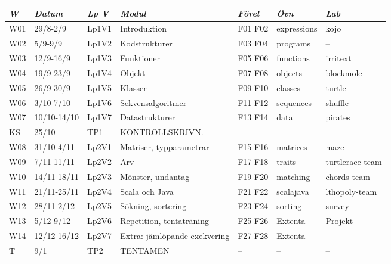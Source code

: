 \begin{tabular}{l|l|l|l|l|l|l}
\textit{W} & \textit{Datum} & \textit{Lp V} & \textit{Modul} & \textit{Förel} & \textit{Övn} & \textit{Lab} \\ \hline \hline
W01 & 29/8-2/9 & Lp1V1 & Introduktion & F01 F02 & expressions & kojo \\
W02 & 5/9-9/9 & Lp1V2 & Kodstrukturer & F03 F04 & programs & -- \\
W03 & 12/9-16/9 & Lp1V3 & Funktioner & F05 F06 & functions & irritext \\
W04 & 19/9-23/9 & Lp1V4 & Objekt & F07 F08 & objects & blockmole \\
W05 & 26/9-30/9 & Lp1V5 & Klasser & F09 F10 & classes & turtle \\
W06 & 3/10-7/10 & Lp1V6 & Sekvensalgoritmer & F11 F12 & sequences & shuffle \\
W07 & 10/10-14/10 & Lp1V7 & Datastrukturer & F13 F14 & data & pirates \\
KS & 25/10 & TP1 & KONTROLLSKRIVN. & -- & -- & -- \\
W08 & 31/10-4/11 & Lp2V1 & Matriser, typparametrar & F15 F16 & matrices & maze \\
W09 & 7/11-11/11 & Lp2V2 & Arv & F17 F18 & traits & turtlerace-team \\
W10 & 14/11-18/11 & Lp2V3 & Mönster, undantag & F19 F20 & matching & chords-team \\
W11 & 21/11-25/11 & Lp2V4 & Scala och Java & F21 F22 & scalajava & lthopoly-team \\
W12 & 28/11-2/12 & Lp2V5 & Sökning, sortering & F23 F24 & sorting & survey \\
W13 & 5/12-9/12 & Lp2V6 & Repetition, tentaträning & F25 F26 & Extenta & Projekt \\
W14 & 12/12-16/12 & Lp2V7 & Extra: jämlöpande exekvering & F27 F28 & Extenta & -- \\
T & 9/1 & TP2 & TENTAMEN & -- & -- & -- \\
\end{tabular}
